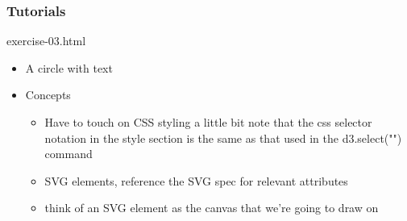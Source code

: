 \documentclass{beamer}
\begin{document}
\begin{frame}
    \frametitle{Tutorials}
    \begin{block}{exercise-03.html}
        \begin{itemize}
            \pause
            \item A circle with text
            \pause
            \item Concepts
            \begin{itemize}
                \pause
                \item Have to touch on CSS styling a little bit
                note that the css selector notation in the style section is 
                the same as that used in the d3.select("") command
                \pause
                \item SVG elements, reference the SVG spec for relevant attributes
                \item think of an SVG element as the canvas that we're going to draw on


\end{itemize}
\end{itemize}
\end{block}
\end{frame}
\end{document}
